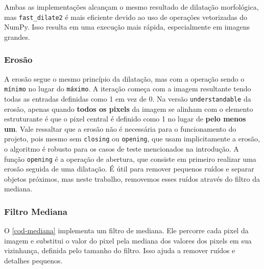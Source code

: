 \documentclass[english, 
               brazil, 
               bsc] %
               {dcomp-abntex2}
\begin{document}
Ambas as implementações alcançam o mesmo resultado de dilatação morfológica, mas \texttt{fast\_dilate2} é mais eficiente devido ao uso de operações vetorizadas do NumPy. Isso resulta em uma execução mais rápida, especialmente em imagens grandes.




\subsubsection{Erosão}


A erosão segue o mesmo princípio da dilatação, mas com a operação sendo o \texttt{mínimo} no lugar do \texttt{máximo}. A iteração começa com a imagem resultante tendo todas as entradas definidas como 1 em vez de 0. Na versão \texttt{understandable} da erosão, apenas quando \textbf{todos os pixels} da imagem se alinham com o elemento estruturante é que o pixel central é definido como 1 no lugar de \textbf{pelo menos um}. Vale ressaltar que a erosão não é necessária para o funcionamento do projeto, pois mesmo sem \texttt{closing} ou \texttt{opening}, que usam implicitamente a erosão, o algoritmo é robusto para os casos de teste mencionados na introdução. A função \texttt{opening} é a operação de abertura, que consiste em primeiro realizar uma erosão seguida de uma dilatação. É útil para remover pequenos ruídos e separar objetos próximos, mas neste trabalho, removemos esses ruídos através do filtro da mediana.




\subsubsection{Filtro Mediana} \label{sec-mediana}


O \autoref{cod-mediana} implementa um filtro de mediana. Ele percorre cada pixel da imagem e substitui o valor do pixel pela mediana dos valores dos pixels em sua vizinhança, definida pelo tamanho do filtro. Isso ajuda a remover ruídos e detalhes pequenos.
\end{document}
